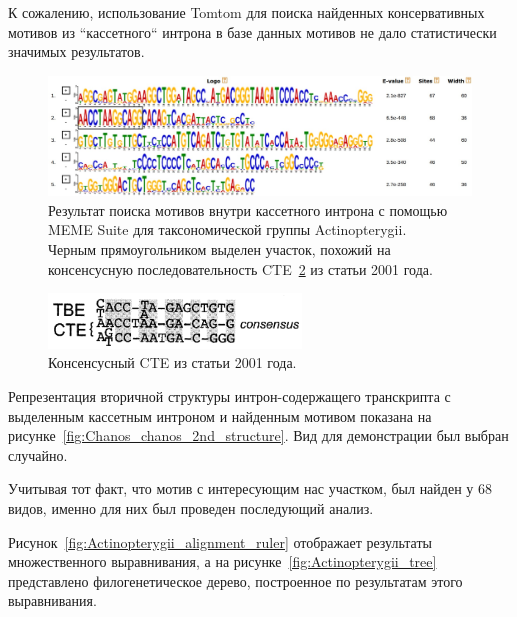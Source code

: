 К сожалению, использование Tomtom для поиска найденных консервативных мотивов из ``кассетного`` интрона в базе данных мотивов не дало статистически значимых результатов.

\begin{figure}[h] %
    \centering
    \includegraphics[width=1.0\textwidth]{images/Actinopterygii_meme_motif}
    \caption{Результат поиска мотивов внутри кассетного интрона с помощью MEME Suite для таксономической группы Actinopterygii.\\
    Черным прямоугольником выделен участок, похожий на консенсусную последовательность CTE~\ref{fig:CTE_consensus} из статьи 2001 года.}
    \label{fig:Actinopterygii_meme}
\end{figure}

\begin{figure}[h] %
    \centering
    \includegraphics[width=0.6\textwidth]{images/CTE_consensus}
    \caption{Консенсусный CTE из статьи 2001 года.}
    \label{fig:CTE_consensus}
\end{figure}

Репрезентация вторичной структуры интрон-содержащего транскрипта с выделенным кассетным интроном и найденным мотивом показана на рисунке~\ref{fig:Chanos_chanos_2nd_structure}.
Вид для демонстрации был выбран случайно.

Учитывая тот факт, что мотив с интересующим нас участком, был найден у 68 видов, именно для них был проведен последующий анализ.

Рисунок~\ref{fig:Actinopterygii_alignment_ruler} отображает результаты множественного выравнивания, а на рисунке~\ref{fig:Actinopterygii_tree} представлено филогенетическое дерево, построенное по результатам этого выравнивания.

